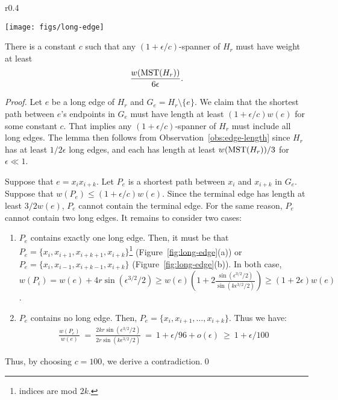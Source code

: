 	\begin{wrapfigure}{r}{0.4\textwidth}
	\vspace{-30pt}
	\begin{center}
		\texttt{[image: figs/long-edge]}
	\end{center}
	\caption{\footnotesize{Paths $P_e$ between $x_i$ and $x_{i+k}$ are highlighted.}}
	\vspace{-5pt}
	\label{fig:long-edge}
\end{wrapfigure}

\begin{lemma}\label{lm:spanner}
	There is a constant $c$ such that any $(1+\epsilon/c)$-spanner of $H_r$ must have weight at least $$ \frac{w(\mathrm{MST}(H_r))}{6\epsilon}.$$
\end{lemma}
\begin{proof}
	Let $e$ be a long edge of $H_r$ and $G_e = H_r\setminus \{e\}$. We claim that the shortest path between $e$'s endpoints in $G_e$ must have length at least $(1+\epsilon/c)w(e)$ for some constant $c$. That implies any $(1+\epsilon/c)$-spanner of $H_r$ must include all long edges. The lemma then follows from Observation~\ref{obs:edge-length} since $H_r$ has at least $1/2\epsilon$ long edges, and each has length at least $w(\mathrm{MST}(H_r))/3$ for $\epsilon \ll 1$.
	
	Suppose that $e = x_{i}x_{i+k}$.  Let $P_e$ is a shortest path between $x_i$ and $x_{i+k}$ in $G_e$. Suppose that $w(P_e) \leq (1+\epsilon/c)w(e)$.  Since the terminal edge has length at least $3/2 w(e)$, $P_e$ cannot  contain the terminal edge. For the same reason, $P_e$ cannot contain two long edges. It remains to consider two cases:
	
	\begin{enumerate}
		\item $P_e$ contains exactly one long edge. Then, it must be that $P_e = \{x_{i},x_{i+1},x_{i+k+1},x_{i+k}\}$\footnote{indices are mod $2k$.} (Figure~\ref{fig:long-edge}(a)) or $P_e = \{x_{i},x_{i-1},x_{i+k-1},x_{i+k}\}$ (Figure~\ref{fig:long-edge}(b)). In both case, $w(P_i) = w(e) + 4r\sin(\epsilon^{3/2}/2)  \geq w(e)(1  + 2\frac{\sin(\epsilon^{3/2}/2)}{\sin(k\epsilon^{3/2}/2)}) \geq (1+2\epsilon)w(e)$.
		\item $P_e$ contains no long edge. Then, $P_e = \{x_i,x_{i+1}, \ldots,x_{i+k}\}$. Thus we have:
		\begin{equation*}
		\begin{split}
		\frac{w(P_e)}{w(e)} ~=~ \frac{2kr\sin(\epsilon^{3/2}/2)}{2r\sin(k \epsilon^{3/2}/2)} ~=~ 1 + \epsilon/96 + o(\epsilon)  ~\geq~ 1+ \epsilon/100
		\end{split}
		\end{equation*}
	\end{enumerate}
	Thus,  by choosing $c = 100$, we derive a contradiction.\qed
\end{proof}



